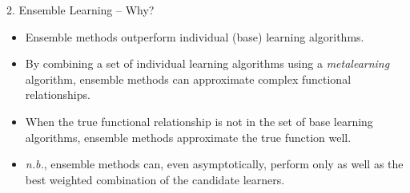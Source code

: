 \documentclass[12pt,t]{beamer}
\begin{document}
\begin{frame}[c]{2. Ensemble Learning -- Why?}

\vspace*{3mm}

\centering

  \begin{itemize}
    \itemsep12pt
    \item Ensemble methods outperform individual (base) learning algorithms.
    \item By combining a set of individual learning algorithms using a
          \textit{metalearning} algorithm, ensemble methods can approximate
          complex functional relationships.
    \item When the true functional relationship is not in the set of base
          learning algorithms, ensemble methods approximate the true function
          well.
    \item \textit{n.b.}, ensemble methods can, even asymptotically, perform only
          as well as the best weighted combination of the candidate learners.
  \end{itemize}
\end{frame}
\end{document}
